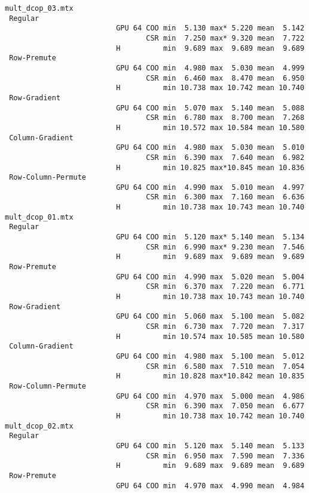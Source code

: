 {\begin{verbatim}
mult_dcop_03.mtx
 Regular
                          GPU 64 COO min  5.130 max* 5.220 mean  5.142
                                 CSR min  7.250 max* 9.320 mean  7.722
                          H          min  9.689 max  9.689 mean  9.689
 Row-Premute
                          GPU 64 COO min  4.980 max  5.030 mean  4.999
                                 CSR min  6.460 max  8.470 mean  6.950
                          H          min 10.738 max 10.742 mean 10.740
 Row-Gradient
                          GPU 64 COO min  5.070 max  5.140 mean  5.088
                                 CSR min  6.780 max  8.700 mean  7.268
                          H          min 10.572 max 10.584 mean 10.580
 Column-Gradient
                          GPU 64 COO min  4.980 max  5.030 mean  5.010
                                 CSR min  6.390 max  7.640 mean  6.982
                          H          min 10.825 max*10.845 mean 10.836
 Row-Column-Permute
                          GPU 64 COO min  4.990 max  5.010 mean  4.997
                                 CSR min  6.300 max  7.160 mean  6.636
                          H          min 10.738 max 10.743 mean 10.740
mult_dcop_01.mtx
 Regular
                          GPU 64 COO min  5.120 max* 5.140 mean  5.134
                                 CSR min  6.990 max* 9.230 mean  7.546
                          H          min  9.689 max  9.689 mean  9.689
 Row-Premute
                          GPU 64 COO min  4.990 max  5.020 mean  5.004
                                 CSR min  6.370 max  7.220 mean  6.771
                          H          min 10.738 max 10.743 mean 10.740
 Row-Gradient
                          GPU 64 COO min  5.060 max  5.100 mean  5.082
                                 CSR min  6.730 max  7.720 mean  7.317
                          H          min 10.574 max 10.585 mean 10.580
 Column-Gradient
                          GPU 64 COO min  4.980 max  5.100 mean  5.012
                                 CSR min  6.580 max  7.510 mean  7.054
                          H          min 10.828 max*10.842 mean 10.835
 Row-Column-Permute
                          GPU 64 COO min  4.970 max  5.000 mean  4.986
                                 CSR min  6.390 max  7.050 mean  6.677
                          H          min 10.738 max 10.742 mean 10.740
mult_dcop_02.mtx
 Regular
                          GPU 64 COO min  5.120 max  5.140 mean  5.133
                                 CSR min  6.950 max  7.590 mean  7.336
                          H          min  9.689 max  9.689 mean  9.689
 Row-Premute
                          GPU 64 COO min  4.970 max  4.990 mean  4.984

\end{verbatim}}
